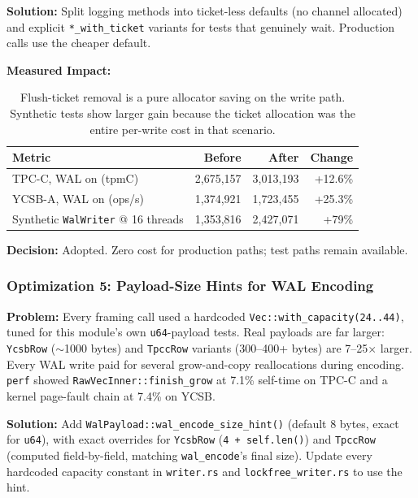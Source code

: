 \documentclass[11pt]{article}
\newcommand{\code}[1]{\texttt{#1}}
\begin{document}
\textbf{Solution:}
Split logging methods into ticket-less defaults (no channel allocated) and explicit
\code{*\_with\_ticket} variants for tests that genuinely wait. Production calls use
the cheaper default.

\textbf{Measured Impact:}

\begin{table}[h]
\centering
\small
\begin{tabular}{lrrr}
\toprule
\textbf{Metric} & \textbf{Before} & \textbf{After} & \textbf{Change} \\
\midrule
TPC-C, WAL on (tpmC) & 2,675,157 & 3,013,193 & +12.6\% \\
YCSB-A, WAL on (ops/s) & 1,374,921 & 1,723,455 & +25.3\% \\
Synthetic \code{WalWriter} @ 16 threads & 1,353,816 & 2,427,071 & +79\% \\
\bottomrule
\end{tabular}
\caption{Flush-ticket removal is a pure allocator saving on the write path. Synthetic tests
show larger gain because the ticket allocation was the entire per-write cost in that scenario.}
\label{tab:ticket_removal}
\end{table}

\textbf{Decision:} Adopted. Zero cost for production paths; test paths remain available.

\subsubsection{Optimization 5: Payload-Size Hints for WAL Encoding}
\label{sec:wal_buffer_size}

\textbf{Problem:}
Every framing call used a hardcoded \code{Vec::with\_capacity(24..44)}, tuned for
this module's own \code{u64}-payload tests. Real payloads are far larger:
\code{YcsbRow} ($\sim$1000 bytes) and \code{TpccRow} variants (300--400+ bytes) are
7--25$\times$ larger. Every WAL write paid for several grow-and-copy reallocations
during encoding. \code{perf} showed \code{RawVecInner::finish\_grow} at 7.1\% self-time
on TPC-C and a kernel page-fault chain at 7.4\% on YCSB.

\textbf{Solution:}
Add \code{WalPayload::wal\_encode\_size\_hint()} (default 8 bytes, exact for
\code{u64}), with exact overrides for \code{YcsbRow} (\code{4 + self.len()}) and
\code{TpccRow} (computed field-by-field, matching \code{wal\_encode}'s final size).
Update every hardcoded capacity constant in \code{writer.rs} and \code{lockfree\_writer.rs}
to use the hint.
\end{document}
